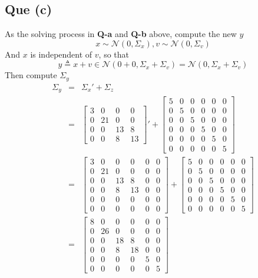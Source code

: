 \documentclass[12pt,letterpaper]{article}
\begin{document}
\subsection*{Que (c)}
As the solving process in \textbf{Q-a} and \textbf{Q-b} above, compute the new $y$
\begin{equation}
	x\sim\mathcal{N}(0,\Sigma_x),v\sim\mathcal{N}(0,\Sigma_v)
\end{equation}
And $x$ is independent of $v$, so that
\begin{equation}
	y\triangleq x+v\in\mathcal{N}(0+0,\Sigma_x+\Sigma_v)=\mathcal{N}(0,\Sigma_x+\Sigma_v)
\end{equation}
Then compute $\Sigma_y$
\begin{eqnarray}
	\Sigma_y
	&=& \Sigma_x'+\Sigma_z\\
	&=& \left[\begin{array}{cccc}
		3 & 0 & 0 & 0\\
		0 & 21 & 0 & 0\\
		0 & 0 & 13 & 8\\
		0 & 0 & 8 & 13
	\end{array}\right]'+\left[\begin{array}{cccccc}
		5 & 0 & 0 & 0 & 0 & 0\\
		0 & 5 & 0 & 0 & 0 & 0\\
		0 & 0 & 5 & 0 & 0 & 0\\
		0 & 0 & 0 & 5 & 0 & 0\\
		0 & 0 & 0 & 0 & 5 & 0\\
		0 & 0 & 0 & 0 & 0 & 5
	\end{array}\right]\nonumber\\
	&=& \left[\begin{array}{cccccc}
		3 & 0 & 0 & 0 & 0 & 0\\
		0 & 21 & 0 & 0 & 0 & 0\\
		0 & 0 & 13 & 8 & 0 & 0\\
		0 & 0 & 8 & 13 & 0 & 0\\
		0 & 0 & 0 & 0 & 0 & 0\\
		0 & 0 & 0 & 0 & 0 & 0
	\end{array}\right]+\left[\begin{array}{cccccc}
		5 & 0 & 0 & 0 & 0 & 0\\
		0 & 5 & 0 & 0 & 0 & 0\\
		0 & 0 & 5 & 0 & 0 & 0\\
		0 & 0 & 0 & 5 & 0 & 0\\
		0 & 0 & 0 & 0 & 5 & 0\\
		0 & 0 & 0 & 0 & 0 & 5
	\end{array}\right]\nonumber\\
	&=& \left[\begin{array}{cccccc}
		8 & 0 & 0 & 0 & 0 & 0\\
		0 & 26 & 0 & 0 & 0 & 0\\
		0 & 0 & 18 & 8 & 0 & 0\\
		0 & 0 & 8 & 18 & 0 & 0\\
		0 & 0 & 0 & 0 & 5 & 0\\
		0 & 0 & 0 & 0 & 0 & 5
	\end{array}\right]\nonumber
\end{eqnarray}
\end{document}
